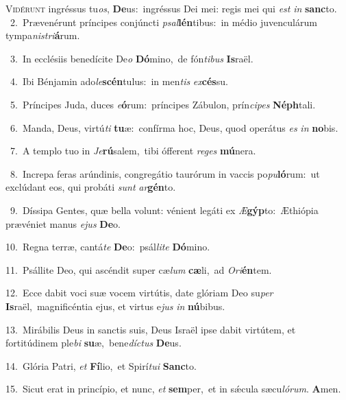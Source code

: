 \lettrine{\initial\textcolor{\initialcolor}{V}}{idérunt} ingréssus tu\-\textit{os}\-, \textbf{De}\-us:~\star ingréssus Dei mei: regis mei qui \textit{est} \textit{in} \textbf{sanc}\-to.\\
{\numbfont\textcolor{\numbcolor}{~2.}}~Prævenérunt príncipes conjúncti \textit{psal}\-\textbf{lén}tibus:~\star in médio juvenculárum tympa\-\textit{nis}\-\textit{tri}\textbf{á}rum.\par
{\numbfont\textcolor{\numbcolor}{~3.}}~In ecclésiis benedícite De\textit{o} \textbf{Dó}\-mino,~\star de fón\-\textit{ti}\-\textit{bus} \textbf{Is}\-raël.\par
{\numbfont\textcolor{\numbcolor}{~4.}}~Ibi Bénjamin ado\-\textit{le}\-\textbf{scén}tulus:~\star in men\textit{tis} \textit{ex}\-\textbf{cés}su.\par
{\numbfont\textcolor{\numbcolor}{~5.}}~Príncipes Juda, duces \textit{e}\-\textbf{ó}rum:~\star príncipes Zábulon, prín\-\textit{ci}\-\textit{pes} \textbf{Néph}\-tali.\par
{\numbfont\textcolor{\numbcolor}{~6.}}~Manda, Deus, virtú\textit{ti} \textbf{tu}\-æ:~\star confírma hoc, Deus, quod operátus \textit{es} \textit{in} \textbf{no}\-bis.\par
{\numbfont\textcolor{\numbcolor}{~7.}}~A templo tuo in \textit{Je}\-\textbf{rú}salem,~\star tibi ófferent \textit{re}\-\textit{ges} \textbf{mú}\-nera.\par
{\numbfont\textcolor{\numbcolor}{~8.}}~Increpa feras arúndinis, congregátio taurórum in vaccis po\-\textit{pu}\-\textbf{ló}rum:~\star ut exclúdant eos, qui probáti \textit{sunt} \textit{ar}\-\textbf{gén}to.\par
{\numbfont\textcolor{\numbcolor}{~9.}}~Díssipa Gentes, quæ bella volunt: vénient legáti ex \textit{Æ}\-\textbf{gýp}to:~\star Æthiópia prævéniet manus \textit{e}\-\textit{jus} \textbf{De}\-o.\par
{\numbfont\textcolor{\numbcolor}{10.}}~Regna terræ, cantá\textit{te} \textbf{De}\-o:~\star psál\-\textit{li}\-\textit{te} \textbf{Dó}\-mino.\par
{\numbfont\textcolor{\numbcolor}{11.}}~Psállite Deo, qui ascéndit super cæ\textit{lum} \textbf{cæ}\-li,~\star ad \textit{O}\-\textit{ri}\textbf{én}tem.\par
{\numbfont\textcolor{\numbcolor}{12.}}~Ecce dabit voci suæ vocem virtútis, date glóriam Deo su\textit{per} \textbf{Is}\-raël,~\star magnificéntia ejus, et virtus e\textit{jus} \textit{in} \textbf{nú}\-bibus.\par
{\numbfont\textcolor{\numbcolor}{13.}}~Mirábilis Deus in sanctis suis, Deus Israël ipse dabit virtútem, et fortitúdinem ple\textit{bi} \textbf{su}\-æ,~\star bene\-\textit{díc}\-\textit{tus} \textbf{De}\-us.\par
{\numbfont\textcolor{\numbcolor}{14.}}~Glória Patri, \textit{et} \textbf{Fí}\-lio,~\star et Spirí\-\textit{tu}\-\textit{i} \textbf{Sanc}\-to.\par
{\numbfont\textcolor{\numbcolor}{15.}}~Sicut erat in princípio, et nunc, \textit{et} \textbf{sem}\-per,~\star et in sǽcula sæcu\-\textit{ló}\-\textit{rum}. \textbf{A}\-men.\par
